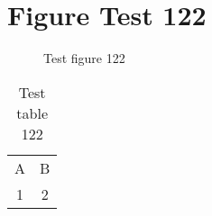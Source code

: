 \documentclass{article}
\begin{document}
\section{Figure Test 122}
\begin{figure}[h]
\caption{Test figure 122}
\end{figure}
\begin{table}[h]
\caption{Test table 122}
\begin{tabular}{cc}
A & B \\
1 & 2
\end{tabular}
\end{table}
\end{document}
